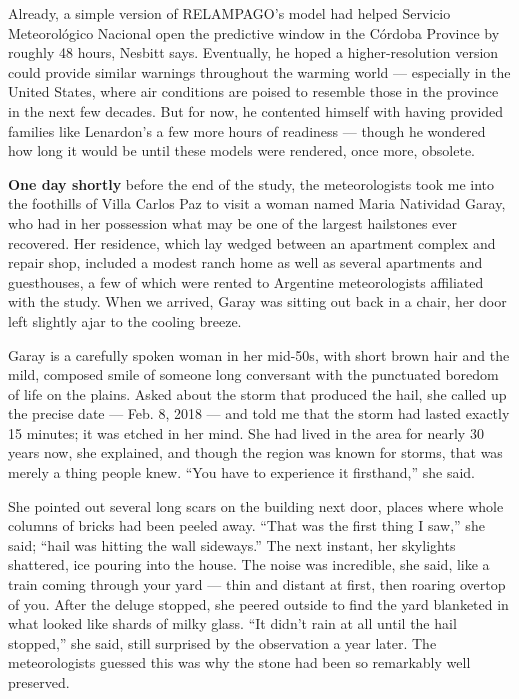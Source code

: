 Already, a simple version of RELAMPAGO's model had helped Servicio
Meteorológico Nacional open the predictive window in the Córdoba
Province by roughly 48 hours, Nesbitt says. Eventually, he hoped a
higher-resolution version could provide similar warnings throughout the
warming world --- especially in the United States, where air conditions
are poised to resemble those in the province in the next few decades.
But for now, he contented himself with having provided families like
Lenardon's a few more hours of readiness --- though he wondered how long
it would be until these models were rendered, once more, obsolete.

\textbf{One day shortly} before the end of the study, the meteorologists
took me into the foothills of Villa Carlos Paz to visit a woman named
Maria Natividad Garay, who had in her possession what may be one of the
largest hailstones ever recovered. Her residence, which lay wedged
between an apartment complex and repair shop, included a modest ranch
home as well as several apartments and guesthouses, a few of which were
rented to Argentine meteorologists affiliated with the study. When we
arrived, Garay was sitting out back in a chair, her door left slightly
ajar to the cooling breeze.

Garay is a carefully spoken woman in her mid-50s, with short brown hair
and the mild, composed smile of someone long conversant with the
punctuated boredom of life on the plains. Asked about the storm that
produced the hail, she called up the precise date --- Feb. 8, 2018 ---
and told me that the storm had lasted exactly 15 minutes; it was etched
in her mind. She had lived in the area for nearly 30 years now, she
explained, and though the region was known for storms, that was merely a
thing people knew. ``You have to experience it firsthand,'' she said.

She pointed out several long scars on the building next door, places
where whole columns of bricks had been peeled away. ``That was the first
thing I saw,'' she said; ``hail was hitting the wall sideways.'' The
next instant, her skylights shattered, ice pouring into the house. The
noise was incredible, she said, like a train coming through your yard
--- thin and distant at first, then roaring overtop of you. After the
deluge stopped, she peered outside to find the yard blanketed in what
looked like shards of milky glass. ``It didn't rain at all until the
hail stopped,'' she said, still surprised by the observation a year
later. The meteorologists guessed this was why the stone had been so
remarkably well preserved.

